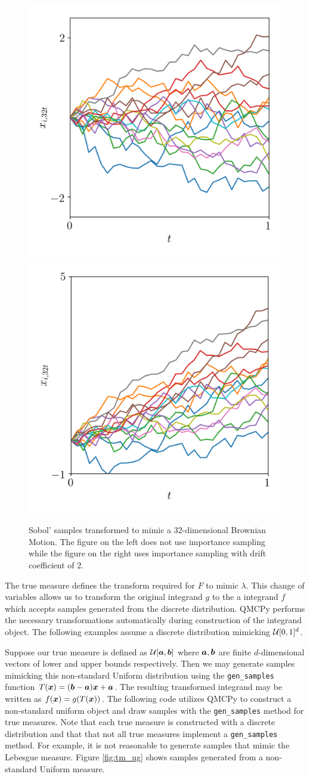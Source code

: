 \documentclass[graybox,footinfo]{svmult}
\begin{document}
\begin{figure}
	\includegraphics[width=.45\textwidth]{ags/figs/tm.bm.png} 
	\includegraphics[width=.45\textwidth]{ags/figs/tm.bm_drift.png}
	\caption{Sobol' samples transformed to mimic a 32-dimensional Brownian Motion. The figure on the left does not use importance sampling while the figure on the right uses importance sampling with drift coefficient of $2$.}
	\label{fig:tm_bm}
\end{figure}

\iffalse

The true measure defines the transform required for $F$ to mimic $\lambda$. This change of variables allows us to transform the original integrand $g$ to the a integrand $f$ which accepts samples generated from the discrete distribution. QMCPy performs the necessary transformations automatically during construction of the integrand object. The following examples assume a discrete distribution mimicking ${\mathcal{U}}[0,1]^d$. 

Suppose our true measure is defined as ${\mathcal{U}}[{\boldsymbol{a}},{\boldsymbol{b}}]$ where ${\boldsymbol{a}},{\boldsymbol{b}}$ are finite $d$-dimensional vectors of lower and upper bounds respectively. Then we may generate samples mimicking this non-standard Uniform distribution using the \texttt{gen\_samples} function $T({\boldsymbol{x}}) = ({\boldsymbol{b}}-{\boldsymbol{a}}){\boldsymbol{x}} + {\boldsymbol{a}}$. The resulting transformed integrand may be written as $f({\boldsymbol{x}}) = g(T({\boldsymbol{x}}))$. The following code utilizes QMCPy to construct a non-standard uniform object and draw samples with the \texttt{gen\_samples} method for true measures.  Note that each true measure is constructed with a discrete distribution and that that not all true measures implement a \texttt{gen\_samples} method. For example, it is not reasonable to generate samples that mimic the Lebesgue measure. Figure \ref{fig:tm_ug} shows samples generated from a non-standard Uniform measure. 
\end{document}
